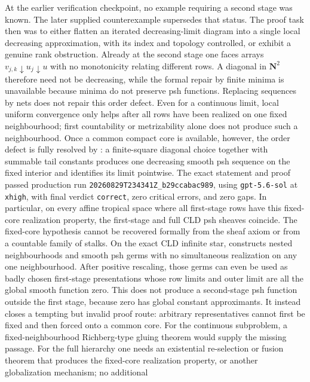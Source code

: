 At the earlier verification checkpoint, no example requiring a second
stage was known.  The later supplied counterexample supersedes that
status.  The proof task then was to
either flatten an iterated decreasing-limit diagram into a single local
decreasing approximation, with its index and topology controlled, or exhibit
a genuine rank obstruction.  Already at the second stage one faces arrays
\(v_{j,k}\downarrow u_j\downarrow u\) with no monotonicity relating different
rows.  A diagonal in \(\mathbf N^2\) therefore need not be decreasing, while
the formal repair by finite minima is unavailable because minima do not
preserve psh functions.  Replacing sequences by nets does not repair this
order defect.  Even for a continuous limit, local uniform convergence only
helps after all rows have been realized on one fixed neighbourhood; first
countability or metrizability alone does not produce such a neighbourhood.
Once a common compact core is available, however, the order defect is fully
resolved by : a finite-square diagonal
choice together with summable tail constants produces one decreasing smooth
psh sequence on the fixed interior and identifies its limit pointwise.  The
exact statement and proof passed production run
\nolinkurl{20260829T234341Z_b29ccabac989}, using
\texttt{gpt-5.6-sol} at \texttt{xhigh}, with final verdict
\texttt{correct}, zero critical errors, and zero gaps.  In particular, on
every affine tropical space where all first-stage rows have this fixed-core
realization property, the first-stage and full CLD psh sheaves coincide.
The fixed-core hypothesis cannot be recovered formally from the sheaf axiom
or from a countable family of stalks.  On the exact CLD infinite star,
 constructs nested
neighbourhoods and smooth psh germs with no simultaneous realization on any
one neighbourhood.  After positive rescaling, those germs can even be used
as badly chosen first-stage presentations whose row limits and outer limit
are all the global smooth function zero.  This does not produce a
second-stage psh function outside the first stage, because zero has global
constant approximants.  It instead closes a tempting but invalid proof
route: arbitrary representatives cannot first be fixed and then forced onto
a common core.
For the continuous subproblem, a fixed-neighbourhood Richberg-type gluing
theorem would supply the missing passage.  For the full hierarchy one needs
an existential re-selection or fusion theorem that produces the fixed-core
realization property, or another globalization mechanism; no additional
